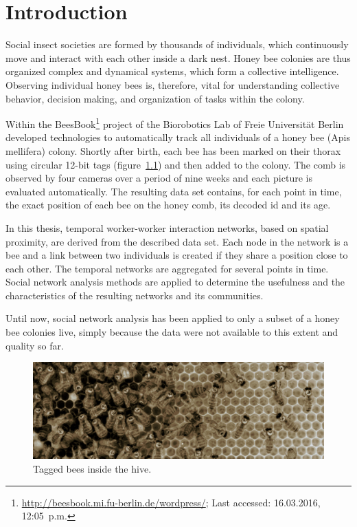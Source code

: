 \chapter{Introduction}
\label{ch:intro}

Social insect societies are formed by thousands of individuals, which continuously move and interact with each other inside a dark nest. Honey bee colonies are thus organized complex and dynamical systems, which form a collective intelligence. Observing individual honey bees is, therefore, vital for understanding collective behavior, decision making, and organization of tasks within the colony.

Within the BeesBook\footnote{\url{http://beesbook.mi.fu-berlin.de/wordpress/}; Last accessed: 16.03.2016, 12:05~p.m.} project of the Biorobotics Lab of Freie Universität Berlin~\textcite{wario2015automatic} developed technologies to automatically track all individuals of a honey bee (Apis mellifera) colony. Shortly after birth, each bee has been marked on their thorax using circular 12-bit tags (figure~\ref{fig:markers}) and then added to the colony. The comb is observed by four cameras over a period of nine weeks and each picture is evaluated automatically. The resulting data set contains, for each point in time, the exact position of each bee on the honey comb, its decoded id and its age.

In this thesis, temporal worker-worker interaction networks, based on spatial proximity, are derived from the described data set. Each node in the network is a bee and a link between two individuals is created if they share a position close to each other. The temporal networks are aggregated for several points in time.  Social network analysis methods are applied to determine the usefulness and the characteristics of the resulting networks and its communities.

Until now, social network analysis has been applied to only a subset of a honey bee colonies live, simply because the data were not available to this extent and quality so far.

\begin{figure}[htb]
	\centering
	\includegraphics[width=1.0\textwidth]{Figures/markers}
	\caption{Tagged bees inside the hive.}
	\label{fig:markers}
\end{figure}

